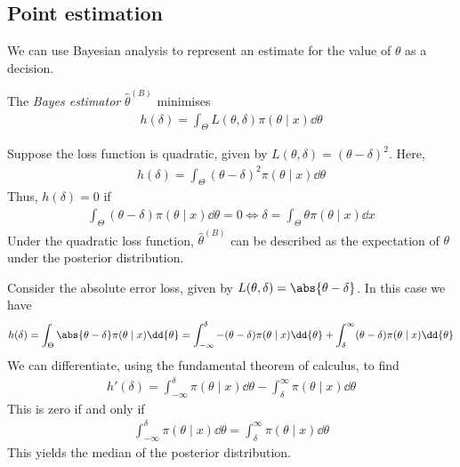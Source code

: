 \subsection{Point estimation}
We can use Bayesian analysis to represent an estimate for the value of $\theta$ as a decision.
\begin{definition}
	The \textit{Bayes estimator} $\hat \theta^{(B)}$ minimises
	\begin{align*}
		h(\delta) = \int_\Theta L(\theta, \delta) \pi(\theta \mid x) \dd{\theta}
	\end{align*}
\end{definition}
\begin{example}
	Suppose the loss function is quadratic, given by $L(\theta, \delta) = (\theta-\delta)^2$.
	Here,
	\begin{align*}
		h(\delta) = \int_\Theta (\theta - \delta)^2 \pi(\theta \mid x) \dd{\theta}
	\end{align*}
	Thus, $h(\delta) = 0$ if
	\begin{align*}
		\int_\Theta (\theta - \delta) \pi(\theta \mid x) \dd{\theta} = 0 \iff \delta = \int_\Theta \theta \pi(\theta \mid x) \dd{x}
	\end{align*}
	Under the quadratic loss function, $\hat \theta^{(B)}$ can be described as the expectation of $\theta$ under the posterior distribution.
\end{example}
\begin{example}
	Consider the absolute error loss, given by $L(\theta, \delta) = \abs{\theta - \delta}$.
	In this case we have
	\begin{align*}
		h(\delta) = \int_\Theta \abs{\theta - \delta} \pi(\theta \mid x) \dd{\theta} = \int_{-\infty}^\delta -(\theta-\delta)\pi(\theta \mid x)\dd{\theta} + \int_\delta^\infty (\theta-\delta)\pi(\theta \mid x)\dd{\theta}
	\end{align*}
	We can differentiate, using the fundamental theorem of calculus, to find
	\begin{align*}
		h'(\delta) = \int_{-\infty}^\delta \pi(\theta\mid x) \dd{\theta} - \int_\delta^\infty \pi(\theta \mid x)\dd{\theta}
	\end{align*}
	This is zero if and only if
	\begin{align*}
		\int_{-\infty}^\delta \pi(\theta\mid x) \dd{\theta} = \int_\delta^{\infty} \pi(\theta \mid x) \dd{\theta}
	\end{align*}
	This yields the median of the posterior distribution.
\end{example}


